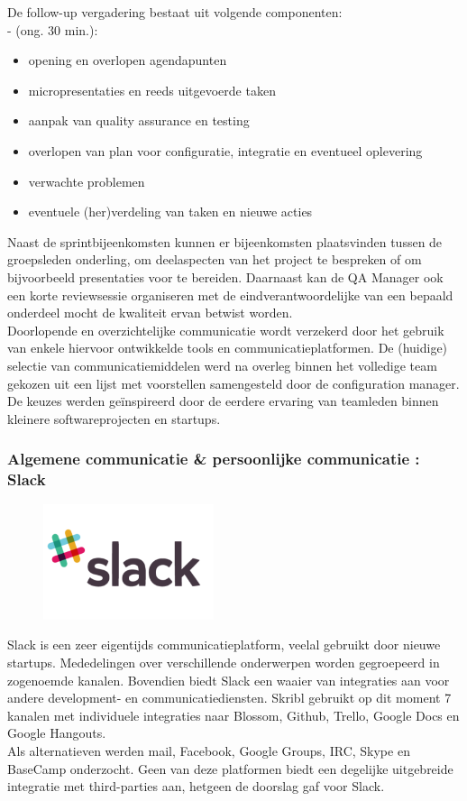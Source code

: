 \documentclass{article}
\begin{document}
\noindent De follow-up vergadering bestaat uit volgende componenten:\\
- (ong. 30 min.):
\begin{itemize}
\item opening en overlopen agendapunten
\item micropresentaties en reeds uitgevoerde taken
\item aanpak van quality assurance en testing 
\item overlopen van plan voor configuratie, integratie en eventueel oplevering
\item verwachte problemen 
\item eventuele (her)verdeling van taken en nieuwe acties 
\end{itemize}

\noindent  Naast de sprintbijeenkomsten kunnen er bijeenkomsten plaatsvinden tussen de groepsleden onderling, om deelaspecten van het project te bespreken of om bijvoorbeeld presentaties voor te bereiden. Daarnaast kan de QA Manager ook een korte reviewsessie organiseren met de eindverantwoordelijke van een bepaald onderdeel mocht de kwaliteit ervan betwist worden. \\

Doorlopende en overzichtelijke communicatie wordt verzekerd door het gebruik van enkele hiervoor ontwikkelde tools en communicatieplatformen. De (huidige) selectie van communicatiemiddelen werd na overleg binnen het volledige team gekozen uit een lijst met voorstellen samengesteld door de configuration manager. De keuzes werden ge\"{i}nspireerd door de eerdere ervaring van teamleden binnen kleinere softwareprojecten en startups. 

\subsubsection*{Algemene communicatie \& persoonlijke communicatie : Slack}
\begin{figure}[h!]
\centering
 \includegraphics[width=50mm]{slack.png}
\end{figure}

\noindent Slack is een zeer eigentijds communicatieplatform, veelal gebruikt door nieuwe startups. Mededelingen over verschillende onderwerpen worden gegroepeerd in zogenoemde kanalen. Bovendien biedt Slack een waaier van integraties aan voor andere development- en communicatiediensten. Skribl gebruikt op dit moment 7 kanalen met individuele integraties naar Blossom, Github, Trello, Google Docs en Google Hangouts.\\
\noindent  Als alternatieven werden mail, Facebook, Google Groups, IRC, Skype en BaseCamp onderzocht. Geen van deze platformen biedt een degelijke uitgebreide integratie met third-parties aan, hetgeen de doorslag gaf voor Slack.
\end{document}
